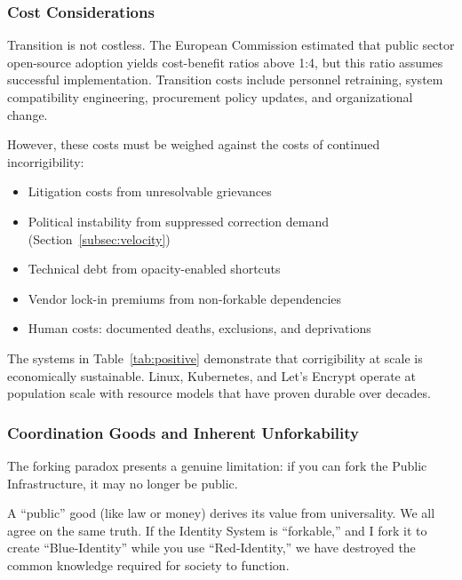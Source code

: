 \documentclass{article}
\begin{document}
\subsubsection{Cost Considerations}

Transition is not costless. The European Commission \citep{eu2021oss} estimated that public sector open-source adoption yields cost-benefit ratios above 1:4, but this ratio assumes successful implementation. Transition costs include personnel retraining, system compatibility engineering, procurement policy updates, and organizational change.

However, these costs must be weighed against the costs of continued incorrigibility:

\begin{itemize}
    \item Litigation costs from unresolvable grievances
    \item Political instability from suppressed correction demand (Section~\ref{subsec:velocity})
    \item Technical debt from opacity-enabled shortcuts
    \item Vendor lock-in premiums from non-forkable dependencies
    \item Human costs: documented deaths, exclusions, and deprivations
\end{itemize}

The systems in Table~\ref{tab:positive} demonstrate that corrigibility at scale is economically sustainable. Linux, Kubernetes, and Let's Encrypt operate at population scale with resource models that have proven durable over decades.

\subsubsection{Coordination Goods and Inherent Unforkability}
\label{subsec:coordination}

The forking paradox presents a genuine limitation: if you can fork the Public Infrastructure, it may no longer be public.

A ``public'' good (like law or money) derives its value from universality. We all agree on the same truth. If the Identity System is ``forkable,'' and I fork it to create ``Blue-Identity'' while you use ``Red-Identity,'' we have destroyed the common knowledge required for society to function.
\end{document}

